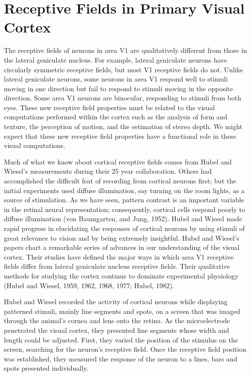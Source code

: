 \section{Receptive Fields in Primary Visual Cortex}

The receptive fields of neurons in area V1 are qualitatively
different from those in the lateral geniculate nucleus.
For example, lateral geniculate neurons
have circularly symmetric receptive fields,
but most V1 receptive fields do not.
Unlike lateral geniculate neurons, some neurons in area V1
respond well to stimuli moving in one direction but fail to respond
to stimuli moving in the opposite direction.  
Some area V1 neurons are binocular,
responding to stimuli from both eyes.  
These new receptive field properties
must be related to the visual computations performed within the
cortex such as the analysis of form and texture,
the perception of motion, and the estimation of stereo depth.
We might expect that these new receptive field properties
have a functional role in these visual computations.

Much of what we know about cortical receptive fields comes from Hubel
and Wiesel's measurements during their 25 year collaboration.  
Others had accomplished the difficult feat of recording 
from cortical neurons first; 
but the initial experiments
used diffuse illumination, say turning
on the room lights, as a source of stimulation.  As we have seen,
pattern contrast is an important variable in the retinal neural
representation; consequently, cortical cells respond poorly to diffuse
illumination (von Baumgarten, and Jung, 1952).
Hubel and Wiesel made rapid progress
in elucidating the responses of cortical neurons by using stimuli of
great relevance to vision and by being extremely insightful.
Hubel and Wiesel's papers chart a remarkable series of
advances in our understanding of the visual cortex.  Their studies
have defined the major ways in which area V1 receptive fields differ
from lateral geniculate nucleus receptive fields.  Their qualitative
methods for studying the cortex continue to dominate experimental
physiology (Hubel and Wiesel, 1959, 1962, 1968, 1977; Hubel, 1982).

Hubel and Wiesel recorded the activity of cortical neurons
while displaying patterned stimuli, mainly line segments
and spots, on a screen that was imaged through
the animal's cornea and lens onto the retina.
As the microelectrode penetrated the visual cortex, they presented line
segments whose width and length could be adjusted.  
First, they varied the
position of the stimulus on the screen, searching for the neuron's
receptive field.  Once the receptive field position was established,
they measured the response of the neuron to a lines,
bars and spots presented individually.

